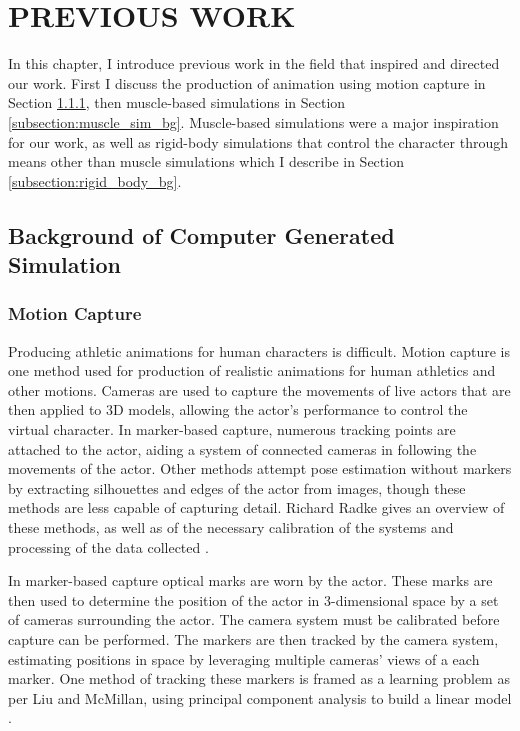 
 
\chapter{PREVIOUS WORK}
\label{chapter:previous_work}
In this chapter, I introduce previous work in the field that inspired and directed our work. First I discuss the production of animation using motion capture in Section \ref{subsection:mocap_bg}, then muscle-based simulations in Section \ref{subsection:muscle_sim_bg}.  Muscle-based simulations were a major inspiration for our work, as well as rigid-body simulations that control the character through means other than muscle simulations which I describe in Section \ref{subsection:rigid_body_bg}.

\section{Background of Computer Generated Simulation}
\label{section:computer_gen_bg}
\subsection{Motion Capture}
\label{subsection:mocap_bg}
Producing athletic animations for human characters is difficult.  Motion capture is one method used for production of realistic animations for human athletics and other motions. Cameras are used to capture the movements of live actors that are then applied to 3D models, allowing the actor's performance to control the virtual character.  In marker-based capture, numerous tracking points are attached to the actor, aiding a system of connected cameras in following the movements of the actor.  Other methods attempt pose estimation without markers by extracting silhouettes and edges of the actor from images, though these methods are less capable of capturing detail. Richard Radke gives an overview of these methods, as well as of the necessary calibration of the systems and processing of the data collected \cite{radke}.

In marker-based capture optical marks are worn by the actor.  These marks are then used to determine the position of the actor in 3-dimensional space by a set of cameras surrounding the actor.  The camera system must be calibrated before capture can be performed.  The markers are then tracked by the camera system, estimating positions in space by leveraging multiple cameras' views of a each marker.  One method of tracking these markers is framed as a learning problem as per Liu and McMillan, using principal component analysis to build a linear model \cite{liu_mocap}.  


